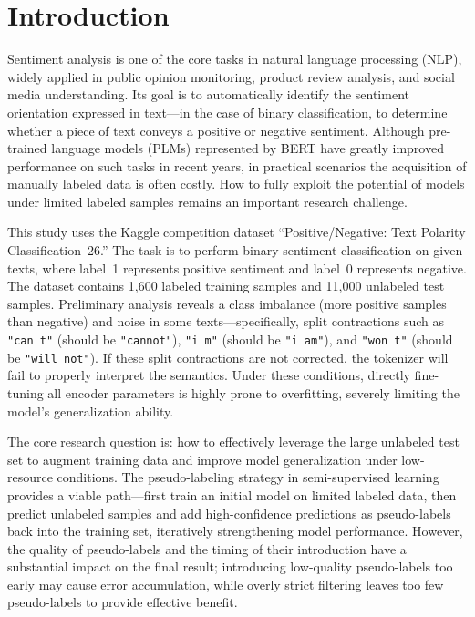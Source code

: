 \documentclass[10pt,twocolumn]{article}
\begin{document}
\section{Introduction}

Sentiment analysis is one of the core tasks in natural language
processing (NLP), widely applied in public opinion monitoring, product
review analysis, and social media understanding. Its goal is to
automatically identify the sentiment orientation expressed in text---in
the case of binary classification, to determine whether a piece of text
conveys a positive or negative sentiment. Although pre-trained language
models (PLMs) represented by BERT have greatly improved performance on
such tasks in recent years, in practical scenarios the acquisition of
manually labeled data is often costly. How to fully exploit the potential
of models under limited labeled samples remains an important research
challenge.

This study uses the Kaggle competition dataset ``Positive/Negative: Text
Polarity Classification~26.'' The task is to perform binary sentiment
classification on given texts, where label~1 represents positive
sentiment and label~0 represents negative. The dataset contains 1,600
labeled training samples and 11,000 unlabeled test samples. Preliminary
analysis reveals a class imbalance (more positive samples than negative)
and noise in some texts---specifically, split contractions such as
\texttt{"can t"} (should be \texttt{"cannot"}), \texttt{"i m"} (should
be \texttt{"i am"}), and \texttt{"won t"} (should be \texttt{"will
not"}). If these split contractions are not corrected, the tokenizer
will fail to properly interpret the semantics. Under these conditions,
directly fine-tuning all encoder parameters is highly prone to
overfitting, severely limiting the model's generalization ability.

The core research question is: how to effectively leverage the large
unlabeled test set to augment training data and improve model
generalization under low-resource conditions. The pseudo-labeling
strategy in semi-supervised learning provides a viable path---first
train an initial model on limited labeled data, then predict unlabeled
samples and add high-confidence predictions as pseudo-labels back into
the training set, iteratively strengthening model performance.
However, the quality of pseudo-labels and the timing of their
introduction have a substantial impact on the final result; introducing
low-quality pseudo-labels too early may cause error accumulation, while
overly strict filtering leaves too few pseudo-labels to provide
effective benefit.
\end{document}
